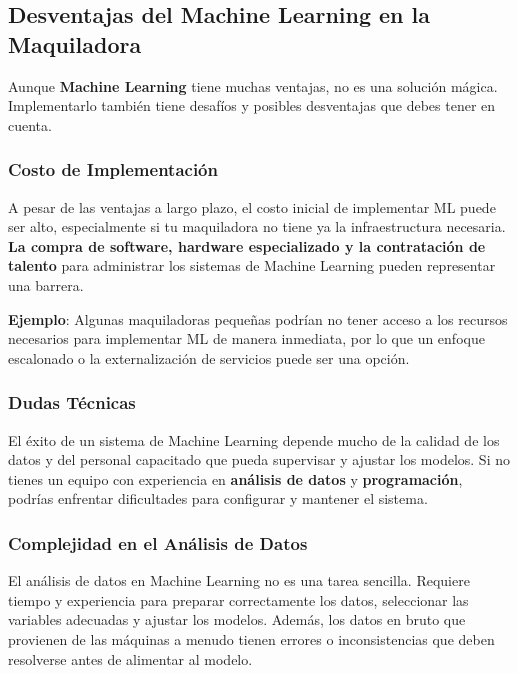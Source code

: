 \documentclass[
  10pt,
  letterpaper,
]{book}
\begin{document}
\subsection{Desventajas del Machine Learning en la
Maquiladora}\label{desventajas-del-machine-learning-en-la-maquiladora}

Aunque \textbf{Machine Learning} tiene muchas ventajas, no es una
solución mágica. Implementarlo también tiene desafíos y posibles
desventajas que debes tener en cuenta.

\subsubsection{\texorpdfstring{\textbf{Costo de
Implementación}}{Costo de Implementación}}\label{costo-de-implementaciuxf3n}

A pesar de las ventajas a largo plazo, el costo inicial de implementar
ML puede ser alto, especialmente si tu maquiladora no tiene ya la
infraestructura necesaria. \textbf{La compra de software, hardware
especializado y la contratación de talento} para administrar los
sistemas de Machine Learning pueden representar una barrera.

\textbf{Ejemplo}: Algunas maquiladoras pequeñas podrían no tener acceso
a los recursos necesarios para implementar ML de manera inmediata, por
lo que un enfoque escalonado o la externalización de servicios puede ser
una opción.

\subsubsection{\texorpdfstring{\textbf{Dudas
Técnicas}}{Dudas Técnicas}}\label{dudas-tuxe9cnicas}

El éxito de un sistema de Machine Learning depende mucho de la calidad
de los datos y del personal capacitado que pueda supervisar y ajustar
los modelos. Si no tienes un equipo con experiencia en \textbf{análisis
de datos} y \textbf{programación}, podrías enfrentar dificultades para
configurar y mantener el sistema.

\subsubsection{\texorpdfstring{\textbf{Complejidad en el Análisis de
Datos}}{Complejidad en el Análisis de Datos}}\label{complejidad-en-el-anuxe1lisis-de-datos}

El análisis de datos en Machine Learning no es una tarea sencilla.
Requiere tiempo y experiencia para preparar correctamente los datos,
seleccionar las variables adecuadas y ajustar los modelos. Además, los
datos en bruto que provienen de las máquinas a menudo tienen errores o
inconsistencias que deben resolverse antes de alimentar al modelo.
\end{document}
